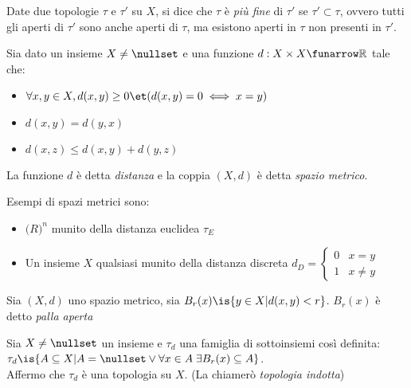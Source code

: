 \begin{defn}
Date due topologie $\tau$ e $\tau'$ su $X$, si dice che $\tau$ è \textit{più fine} di $\tau'$ se $\tau'\subset\tau$, ovvero tutti gli aperti di $\tau'$ sono anche aperti di $\tau$, ma esistono aperti in $\tau$ non presenti in $\tau'$.
\end{defn}


\begin{defn}
Sia dato un insieme $X\neq\nullset$ e una funzione $d: X \times X \funarrow \mathbb{R}$ tale che:
\begin{itemize}
\item $\forall x,y \in X,  d(x,y)\ge0 \et (d(x,y)=0 \iff x=y)$
\item $d(x,y) = d(y,x)$
\item $d(x,z) \le d(x,y) + d(y,z)$
\end{itemize}
La funzione $d$ è detta \textit{distanza} e la coppia $(X,d)$ è detta \textit{spazio metrico}.
\end{defn}

\begin{es}
Esempi di spazi metrici sono:
\begin{itemize}
\item  $\mathbb(R)^n$ munito della distanza euclidea $\tau_E$
\item Un insieme $X$ qualsiasi munito della distanza discreta $d_D= \begin{cases} 0 & x=y \\ 1 & x \neq y \end{cases}$
\end{itemize}
\end{es}

\begin{defn}
Sia $(X,d)$ uno spazio metrico, sia $B_r(x) \is \{y \in X | d(x,y) < r\}$. $B_r(x)$ è detto \textit{palla aperta}
\end{defn}

\begin{prop}
Sia $X \neq \nullset$ un insieme e $\tau_d$ una famiglia di sottoinsiemi così definita: $\tau_d \is \{ A \subseteq  X | A = \nullset \lor \forall x \in A \;\exists B_r(x) \subseteq A \}$.\\
Affermo che $\tau_d$ è una topologia su $X$. (La chiamerò \textit{topologia indotta})
\end{prop}

